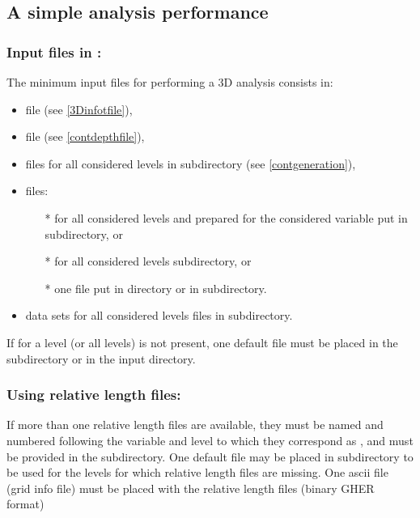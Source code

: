 \subsection{A simple analysis performance}

\subsubsection{ Input files in :}

The minimum input files for performing a \diva 3D analysis consists in:

\begin{itemize}
\item {} file (see \ref{3Dinfotfile}),
\item {} file (see \ref{contdepthfile}),
\item {} files for all considered levels in  subdirectory (see \ref{contgeneration}),
\item {} files:
\begin{itemize}
\item[*]  for all considered levels and prepared for the considered variable put in  subdirectory, or
\item[*]  for all considered levels  subdirectory, or
\item[*] one  file put in   directory or in  subdirectory.
\end{itemize}
\item data sets for all considered levels  files in   subdirectory.
\end{itemize}


\btips
 If for a level (or all levels)  is not present, one default   file must be placed in the  subdirectory or in the input directory.
\etips

\subsubsection{ Using relative length files:}

If more than one relative length files are available, they must be  named and numbered following the variable and level to which they correspond as , and must be provided in the  subdirectory. One default file  may be placed in   subdirectory to be used for the levels for which relative length files are missing. One  ascii file (grid info file) must be placed with the relative length files (binary GHER format)

